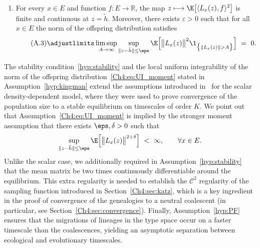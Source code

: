 \begin{refsegment}
\begin{assumption}
\begin{enumerate}
  \item  
    For every $x\in E$ and function $f:E\to \mathbb{R}$, the map $z \longmapsto \E\big[\langle L_x(z), f\rangle^2\big]$ is
    finite and continuous at $z = \tilde h$. Moreover, there exists $\varepsilon > 0$ such
    that for all $x\in E$ the norm of the offspring distribution satisfies
    \begin{equation} \label{Ch4:eq:UI_moment}\tag{A.3}
        \adjustlimits\limsup_{A \to \infty}\sup_{\lVert z-\tilde h\rVert \leq \eps} 
        \E\Big[\big\lVert L_x(z)\big\rVert^2 \1_{\big\{ \lVert L_x(z)\rVert > A\big\}}\Big]\ =\ 0.
    \end{equation}
  \end{enumerate}
\end{assumption}
The stability condition~\eqref{hyp:stability} and the local uniform integrability of the norm of the offspring distribution~\eqref{Ch4:eq:UI_moment} stated in Assumption~\ref{hyp:kingman} extend the assumptions introduced in~\cite{AFRS_2025} for the scalar density-dependent model, where they were used to prove convergence of the population size to a stable equilibrium on timescales of order $K$.
 We point out that Assumption~\ref{Ch4:eq:UI_moment} is implied by the stronger moment assumption that there exists $\eps,\delta>0$ such that
    \[\sup_{\lVert z-\tilde h\rVert \leq \eps}\E
    \Big[\big\lVert L_x(z)\big\rVert^{2+\delta} \Big]\ <\ \infty,\qquad \forall x\in E.
     \]
 Unlike the scalar case, we additionally required in Assumption~\ref{hyp:stability} that the mean matrix be two times continuously differentiable around the equilibrium. This extra regularity is needed to establish the $\mathcal{C}^2$ regularity of the sampling function introduced in Section~\ref{Ch4:sec:katz}, which is a key ingredient in the proof of convergence of the genealogies to a neutral coalescent (in particular, see Section~\ref{Ch4:sec:convergence}). Finally, Assumption~\ref{hyp:PF} ensures that the migrations of lineages in the type space occur on a faster timescale than the coalescences, yielding an asymptotic separation between ecological and evolutionary timescales.


\end{refsegment}
